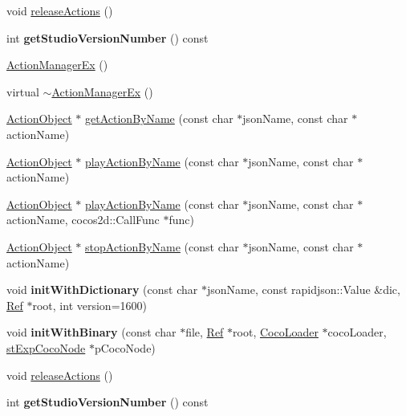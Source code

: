 \begin{DoxyCompactItemize}
void \hyperlink{classcocostudio_1_1ActionManagerEx_a3e4f9d42f9530eb7588d393843de0f3d}{release\+Actions} ()
\item 
\mbox{\label{classcocostudio_1_1ActionManagerEx_af5a0f9b49b84baba188e4654ead3e784}} 
int {\bfseries get\+Studio\+Version\+Number} () const
\item 
\hyperlink{classcocostudio_1_1ActionManagerEx_adf660952e77be05f9a9d22fcffaae3cc}{Action\+Manager\+Ex} ()
\item 
virtual \hyperlink{classcocostudio_1_1ActionManagerEx_a043f5ab728c90d047de208cbc41ebe1b}{$\sim$\+Action\+Manager\+Ex} ()
\item 
\hyperlink{classcocostudio_1_1ActionObject}{Action\+Object} $\ast$ \hyperlink{classcocostudio_1_1ActionManagerEx_ac43c9de6ceb74500ca80ab711e1b0a39}{get\+Action\+By\+Name} (const char $\ast$json\+Name, const char $\ast$action\+Name)
\item 
\hyperlink{classcocostudio_1_1ActionObject}{Action\+Object} $\ast$ \hyperlink{classcocostudio_1_1ActionManagerEx_ad26c073fce28a6fcddf8f42217a7e9ab}{play\+Action\+By\+Name} (const char $\ast$json\+Name, const char $\ast$action\+Name)
\item 
\hyperlink{classcocostudio_1_1ActionObject}{Action\+Object} $\ast$ \hyperlink{classcocostudio_1_1ActionManagerEx_a9c8f084cbe82ff09dc1324448fcfffd3}{play\+Action\+By\+Name} (const char $\ast$json\+Name, const char $\ast$action\+Name, cocos2d\+::\+Call\+Func $\ast$func)
\item 
\hyperlink{classcocostudio_1_1ActionObject}{Action\+Object} $\ast$ \hyperlink{classcocostudio_1_1ActionManagerEx_a4c83b7dbf2fea12e786cedc56c90c38d}{stop\+Action\+By\+Name} (const char $\ast$json\+Name, const char $\ast$action\+Name)
\item 
\mbox{\label{classcocostudio_1_1ActionManagerEx_a84d40f6da2ff54e4df25195dff2d1f62}} 
void {\bfseries init\+With\+Dictionary} (const char $\ast$json\+Name, const rapidjson\+::\+Value \&dic, \hyperlink{classRef}{Ref} $\ast$root, int version=1600)
\item 
\mbox{\label{classcocostudio_1_1ActionManagerEx_af3ce7cfaa113bc66c313e292659e35b1}} 
void {\bfseries init\+With\+Binary} (const char $\ast$file, \hyperlink{classRef}{Ref} $\ast$root, \hyperlink{classcocostudio_1_1CocoLoader}{Coco\+Loader} $\ast$coco\+Loader, \hyperlink{structcocostudio_1_1stExpCocoNode}{st\+Exp\+Coco\+Node} $\ast$p\+Coco\+Node)
\item 
void \hyperlink{classcocostudio_1_1ActionManagerEx_a3e4f9d42f9530eb7588d393843de0f3d}{release\+Actions} ()
\item 
\mbox{\label{classcocostudio_1_1ActionManagerEx_af5a0f9b49b84baba188e4654ead3e784}} 
int {\bfseries get\+Studio\+Version\+Number} () const
\end{DoxyCompactItemize}
